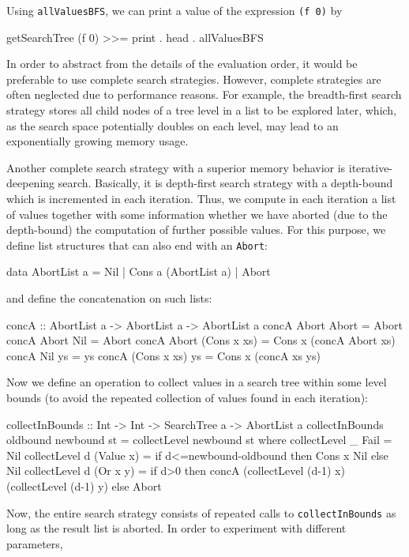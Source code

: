 \documentclass[english]{lni}
\newcommand{\code}[1]{\texttt{\small{}#1}}
\begin{document}
Using \code{allValuesBFS}, we can print a value
of the expression \code{(f 0)} by
%
\begin{curry}
getSearchTree (f 0) >>= print . head . allValuesBFS
\end{curry}
%
In order to abstract from the details of the evaluation order,
it would be preferable to use complete search strategies.
However, complete strategies are often neglected due to performance reasons.
For example, the breadth-first search strategy stores all child nodes 
of a tree level in a list to be explored later, which, as the search space
potentially doubles on each level, may lead to an exponentially
growing memory usage.

Another complete search strategy with a superior memory behavior
is iterative-deepening search.
Basically, it is depth-first search strategy with a depth-bound
which is incremented in each iteration.
Thus, we compute in each iteration a list of values
together with some information whether we have aborted
(due to the depth-bound) the computation of further possible values.
For this purpose, we define list structures that can also end
with an \code{Abort}:
%
\begin{curry}
data AbortList a = Nil | Cons a (AbortList a) | Abort
\end{curry}
%
and define the concatenation on such lists:
%
\begin{curry}
concA :: AbortList a -> AbortList a -> AbortList a
concA Abort       Abort       = Abort
concA Abort       Nil         = Abort
concA Abort       (Cons x xs) = Cons x (concA Abort xs)
concA Nil         ys          = ys
concA (Cons x xs) ys          = Cons x (concA xs ys)
\end{curry}
%
Now we define an operation to collect values in a search tree
within some level bounds (to avoid the repeated collection
of values found in each iteration):
%
\begin{curry}
collectInBounds :: Int -> Int -> SearchTree a -> AbortList a
collectInBounds oldbound newbound st = collectLevel newbound st
 where
  collectLevel _ Fail      = Nil
  collectLevel d (Value x) = if d<=newbound-oldbound then Cons x Nil
                                                     else Nil
  collectLevel d (Or x y)  =
    if d>0 then concA (collectLevel (d-1) x) (collectLevel (d-1) y)
           else Abort
\end{curry}
%
Now, the entire search strategy consists of
repeated calls to \code{collectInBounds} as long as the result list
is aborted. In order to experiment with different parameters,
\end{document}
